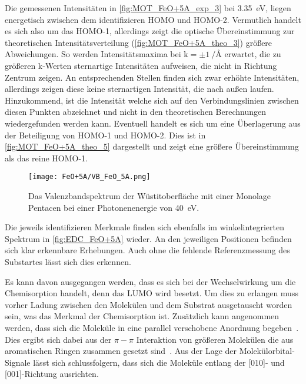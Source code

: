         Die gemessenen Intensitäten in \autoref{fig:MOT_FeO+5A_exp_3} bei \SI{3.35}{\electronvolt}, liegen energetisch zwischen dem identifizieren HOMO und HOMO-2.
        Vermutlich handelt es sich also um das HOMO-1, allerdings zeigt die optische Übereinstimmung zur theoretischen Intensitätsverteilung (\autoref{fig:MOT_FeO+5A_theo_3}) größere Abweichungen.
        So werden Intensitätsmaxima bei $\text{k} = \pm\SI[per-mode=reciprocal]{1}{\per\angstrom}$ erwartet, die zu größeren k-Werten sternartige Intensitäten aufweisen, die nicht in Richtung Zentrum zeigen.
        An entsprechenden Stellen finden sich zwar erhöhte Intensitäten, allerdings zeigen diese keine sternartigen Intensität, die nach außen laufen.
        Hinzukommend, ist die Intensität welche sich auf den Verbindungslinien zwischen diesen Punkten abzeichnet und nicht in den theoretischen Berechnungen wiedergefunden werden kann.
        Eventuell handelt es sich um eine Überlagerung aus der Beteiligung von HOMO-1 und HOMO-2.
        Dies ist in \autoref{fig:MOT_FeO+5A_theo_5} dargestellt und zeigt eine größere Übereinstimmung als das reine HOMO-1.

        \begin{figure}
            \centering
            \texttt{[image: FeO+5A/VB\_FeO\_5A.png]}
            \caption{Das Valenzbandspektrum der Wüstitoberfläche mit einer Monolage Pentacen bei einer Photonenenergie von \SI{40}{\electronvolt}.}
            \label{fig:EDC_FeO+5A}
        \end{figure}
        Die jeweils identifizieren Merkmale finden sich ebenfalls im winkelintegrierten Spektrum in \autoref{fig:EDC_FeO+5A} wieder.
        An den jeweiligen Positionen befinden sich klar erkennbare Erhebungen.
        Auch ohne die fehlende Referenzmessung des Substartes lässt sich dies erkennen.

        Es kann davon ausgegangen werden, dass es sich bei der Wechselwirkung um die Chemisorption handelt, denn das LUMO wird besetzt.
        Um dies zu erlangen muss vorher Ladung zwischen den Molekülen und dem Substrat ausgetauscht worden sein, was das Merkmal der Chemisorption ist.
        Zusätzlich kann angenommen werden, dass sich die Moleküle in eine parallel verschobene Anordnung begeben~\cite{IF_13}.
        Dies ergibt sich dabei aus der $\pi-\pi$ Interaktion von größeren Molekülen die aus aromatischen Ringen zusammen gesetzt sind~\cite{IF_13}.
        Aus der Lage der Molekülorbital-Signale lässt sich schlussfolgern, dass sich die Moleküle entlang der [010]- und [001]-Richtung ausrichten.

